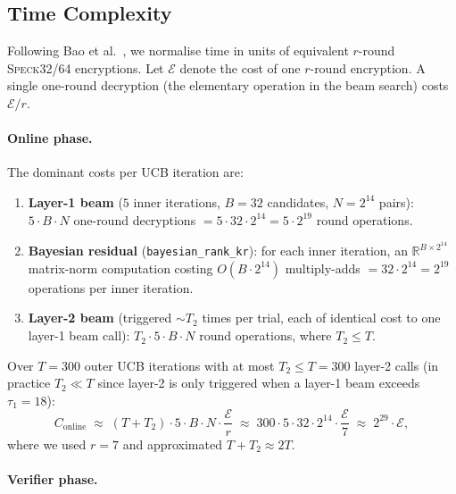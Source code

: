 \documentclass[runningheads]{llncs}
\newcommand{\speck}{\textsc{Speck}32/64}
\begin{document}
\subsection{Time Complexity}
\label{subsec:time}

Following Bao et al.~\cite{BLY23}, we normalise time in units of
equivalent $r$-round \speck{} encryptions.
Let $\mathcal{E}$ denote the cost of one $r$-round encryption.
A single one-round decryption (the elementary operation in the beam
search) costs $\mathcal{E}/r$.

\paragraph{Online phase.}

The dominant costs per UCB iteration are:
\begin{enumerate}
  \item \textbf{Layer-1 beam} ($5$ inner iterations, $B = 32$ candidates,
    $N = 2^{14}$ pairs): $5 \cdot B \cdot N$ one-round decryptions
    $= 5 \cdot 32 \cdot 2^{14} = 5 \cdot 2^{19}$ round operations.
  \item \textbf{Bayesian residual} (\texttt{bayesian\_rank\_kr}):
    for each inner iteration, an $\mathbb{R}^{B \times 2^{14}}$ matrix-norm
    computation costing $O(B \cdot 2^{14})$ multiply-adds
    $= 32 \cdot 2^{14} = 2^{19}$ operations per inner iteration.
  \item \textbf{Layer-2 beam} (triggered $\sim T_2$ times per trial,
    each of identical cost to one layer-1 beam call):
    $T_2 \cdot 5 \cdot B \cdot N$ round operations, where $T_2 \le T$.
\end{enumerate}

Over $T = 300$ outer UCB iterations with at most $T_2 \le T = 300$
layer-2 calls (in practice $T_2 \ll T$ since layer-2 is only triggered when
a layer-1 beam exceeds $\tau_1 = 18$):
\begin{equation}
  \label{eq:time-online}
  C_{\mathrm{online}}
  \;\approx\;
  (T + T_2) \cdot 5 \cdot B \cdot N \cdot \frac{\mathcal{E}}{r}
  \;\approx\;
  300 \cdot 5 \cdot 32 \cdot 2^{14} \cdot \frac{\mathcal{E}}{7}
  \;\approx\; 2^{29} \cdot \mathcal{E},
\end{equation}
where we used $r = 7$ and approximated $T + T_2 \approx 2T$.

\paragraph{Verifier phase.}
\end{document}
